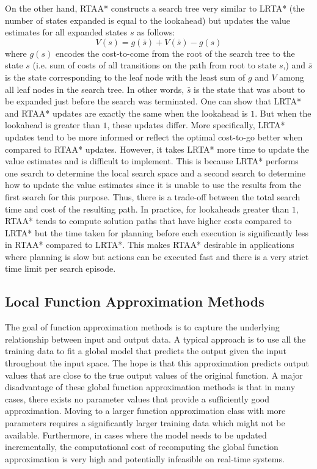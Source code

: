 On the other hand, RTAA* constructs a search tree very similar to
LRTA* (the number of states expanded is equal to the lookahead) but
updates the value estimates for all expanded states $s$ as follows:
\begin{equation}
  \label{eq:11}
  V(s) = g(\bar{s}) + V(\bar{s}) - g(s)
\end{equation}
where $g(s)$ encodes the cost-to-come from the root of the search tree
to the state $s$ (i.e. sum of costs of all transitions on the path
from root to state $s$,) and $\bar{s}$ is the state corresponding to
the leaf node with the least sum of $g$ and $V$ among all leaf nodes
in the search tree. In other words, $\bar{s}$ is the state that was
about to be expanded just before the search was terminated. One can
show that LRTA* and RTAA* updates are exactly the same when the
lookahead is $1$. But when the lookahead is greater than $1$, these
updates differ. More specifically, LRTA* updates tend to be more
informed or reflect the optimal cost-to-go better when compared to
RTAA* updates. However, it takes LRTA* more time to update the value
estimates and is difficult to implement. This is because LRTA*
performs one search to determine the local search space and a second
search to determine how to update the value estimates since it is
unable to use the results from the first search for this
purpose. Thus, there is a trade-off between the total search time and
cost of the resulting path. In practice, for lookaheads greater than
$1$, RTAA* tends to compute solution paths that have higher costs
compared to LRTA* but the time taken for planning before each execution is
significantly less in RTAA* compared to LRTA*. This makes RTAA*
desirable in applications where planning is slow but actions can be
executed fast and there is a very strict time limit per search episode.

\subsection{Local Function Approximation Methods}
\label{sec:local-funct-appr-1}

The goal of function approximation methods is to capture the
underlying relationship between input and output data. A typical
approach is to use all the training data to fit a global model that
predicts the output given the input throughout the input space. The
hope is that this approximation predicts output values that are close to the
true output values of the original function. A major disadvantage of
these global function approximation methods is that in many cases,
there exists no parameter values that provide a sufficiently good
approximation. Moving to a larger function approximation class with
more parameters requires a significantly larger training data which
might not be available. Furthermore, in cases where the model needs to
be updated incrementally, the computational cost of recomputing the
global function approximation is very high and potentially infeasible
on real-time systems.

